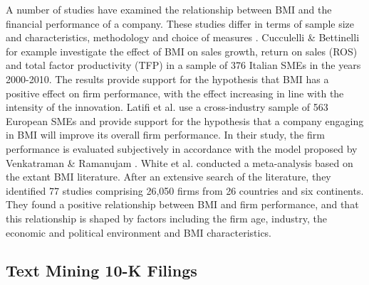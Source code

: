 \documentclass[manuscript,screen,review]{acmart}
\begin{document}
A number of studies have examined the relationship between BMI and the
financial performance of a company. These studies differ in terms of
sample size and characteristics, methodology and choice of measures
\citep{foss_fifteen_2017, white_exploring_2022}. Cucculelli \&
Bettinelli \citeyearpar{cucculelli_business_2015} for example
investigate the effect of BMI on sales growth, return on sales (ROS) and
total factor productivity (TFP) in a sample of 376 Italian SMEs in the
years 2000-2010. The results provide support for the hypothesis that BMI
has a positive effect on firm performance, with the effect increasing in
line with the intensity of the innovation. Latifi et al.
\citeyearpar{latifi_business_2021} use a cross-industry sample of 563
European SMEs and provide support for the hypothesis that a company
engaging in BMI will improve its overall firm performance. In their
study, the firm performance is evaluated subjectively in accordance with
the model proposed by Venkatraman \& Ramanujam
\citeyearpar{venkatraman_measurement_1986}. White et al.
\citeyearpar{white_exploring_2022} conducted a meta-analysis based on
the extant BMI literature. After an extensive search of the literature,
they identified 77 studies comprising 26,050 firms from 26 countries and
six continents. They found a positive relationship between BMI and firm
performance, and that this relationship is shaped by factors including
the firm age, industry, the economic and political environment and BMI
characteristics.

\subsection{Text Mining 10-K Filings}\label{text-mining-10-k-filings}
\end{document}
